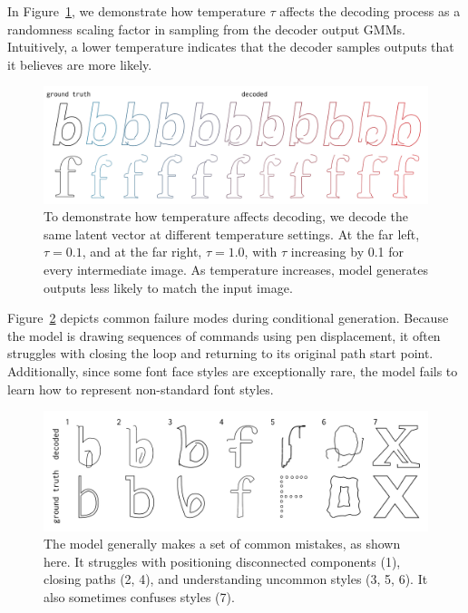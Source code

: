 In Figure~\ref{fig:temp}, we demonstrate how temperature $\tau$ affects the decoding process as a randomness scaling factor in sampling from the decoder output GMMs.
Intuitively, a lower temperature indicates that the decoder samples outputs that it believes are more likely.
\begin{figure}[h]
    \centering
	\includegraphics[width=\textwidth]{figures/temp_grid}
    \caption[The temperature grid for a conditionally generated glyph]
    {To demonstrate how temperature affects decoding, we decode the same latent vector at different temperature settings.
    At the far left, $\tau=0.1$, and at the far right, $\tau=1.0$, with $\tau$ increasing by 0.1 for every intermediate image.
    As temperature increases, model generates outputs less likely to match the input image.
    \label{fig:temp}}
\end{figure}

Figure~\ref{fig:fails} depicts common failure modes during conditional generation.
Because the model is drawing sequences of commands using pen displacement, it often struggles with closing the loop and returning to its original path start point.
Additionally, since some font face styles are exceptionally rare, the model fails to learn how to represent non-standard font styles.
\begin{figure}[h]
    \centering
	\includegraphics[width=\textwidth]{figures/fails}
    \caption[Common failure cases for conditional generation]
    {The model generally makes a set of common mistakes, as shown here.
    It struggles with positioning disconnected components (1), closing paths (2, 4), and understanding uncommon styles (3, 5, 6). It also sometimes confuses styles (7).\label{fig:fails}}
\end{figure}
\newpage


